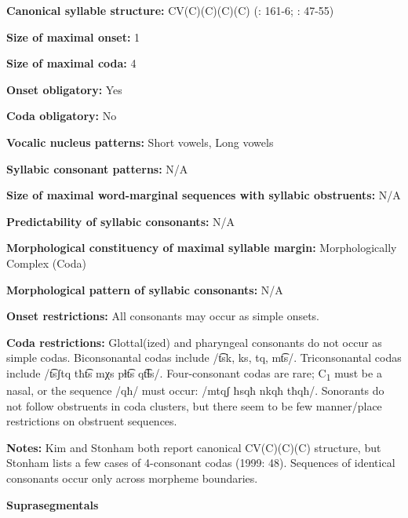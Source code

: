 \textbf{Canonical syllable structure:} CV(C)(C)(C)(C) (\citealt{Kim2003}: 161-6; \citealt{Stonham1999}: 47-55)



\textbf{Size of maximal onset:} 1



\textbf{Size of maximal coda:} 4



\textbf{Onset obligatory:} Yes



\textbf{Coda obligatory:} No



\textbf{Vocalic nucleus patterns:} Short vowels, Long vowels



\textbf{Syllabic consonant patterns:} N/A



\textbf{Size of maximal word{}-marginal sequences with syllabic obstruents:} N/A



\textbf{Predictability of syllabic consonants:} N/A



\textbf{Morphological constituency of maximal syllable margin:} Morphologically Complex (Coda)



\textbf{Morphological pattern of syllabic consonants:} N/A



\textbf{Onset restrictions:} All consonants may occur as simple onsets.



\textbf{Coda restrictions:} Glottal(ized) and pharyngeal consonants do not occur as simple codas. Biconsonantal codas include /t͡sk, ks, tq, mt͡s/. Triconsonantal codas include /t͡sʃtq tħt͡s mχs pɬt͡s qt͡ɬs/. Four-consonant codas are rare; C\textsubscript{1} must be a nasal, or the sequence /qħ/ must occur: /mtqʃ ħsqħ nkqħ tħqħ/. Sonorants do not follow obstruents in coda clusters, but there seem to be few manner/place restrictions on obstruent sequences.



\textbf{Notes:} Kim and Stonham both report canonical CV(C)(C)(C) structure, but Stonham lists a few cases of 4-consonant codas (1999: 48). Sequences of identical consonants occur only across morpheme boundaries.



\textbf{Suprasegmentals}



